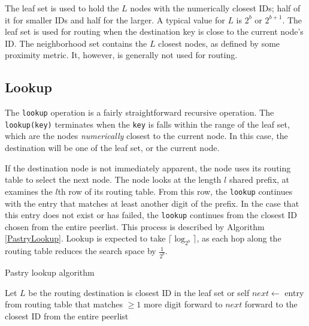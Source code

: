 \documentclass[10pt,letterpaper,twoside]{report}
\begin{document}
The leaf set is used to hold the $L$ nodes with the numerically closest IDs;  half of it for smaller IDs and half for the larger.
A typical value for $L$ is $2^b$ or $2^{b+1}$.
The leaf set is used for routing when the destination key is close to the current node's ID.
The neighborhood set contains the $L$ closest nodes, as defined by some proximity metric.  
It, however, is generally not used for routing.  



\subsection*{Lookup}
The \texttt{lookup} operation is a fairly straightforward recursive operation.
The \texttt{lookup(key)} terminates when the \texttt{key} is falls within the range of the leaf set, which are the nodes \emph{numerically} closest to the current node.
In this case, the destination will be one of the leaf set, or the current node.

If the destination node is not immediately apparent, the node uses its routing table to select the next node.
The node looks at the length $l$ shared prefix,  at examines the $l$th row of its routing table.
From this row, the \texttt{lookup} continues with the entry that matches at least another digit of the prefix.
In the case that this entry does not exist or has failed, the \texttt{lookup} continues from the closest ID chosen from the entire peerlist.
This process is described by Algorithm \ref{PastryLookup}.
Lookup is expected  to take $\lceil \log_{2^{b}} \rceil $, as each hop along the routing table reduces the search space by $\frac{1}{2^{b}}$.
 
\begin{algorithm}
    \caption{Pastry lookup algorithm}
    \label{PastryLookup}
    \begin{algorithmic}
        \State Let $L$ be the routing  
            	\State destination is closest ID in the leaf set or self
            \Else
            	\State $next\gets$ entry from routing table that matches $\geq 1$ more digit
                	\State forward to $next$
            	\Else
                	\State forward to the closest ID from the entire peerlist
                \EndIf
                
            \EndIf
        \EndFunction
    \end{algorithmic}
\end{algorithm}
\end{document}
